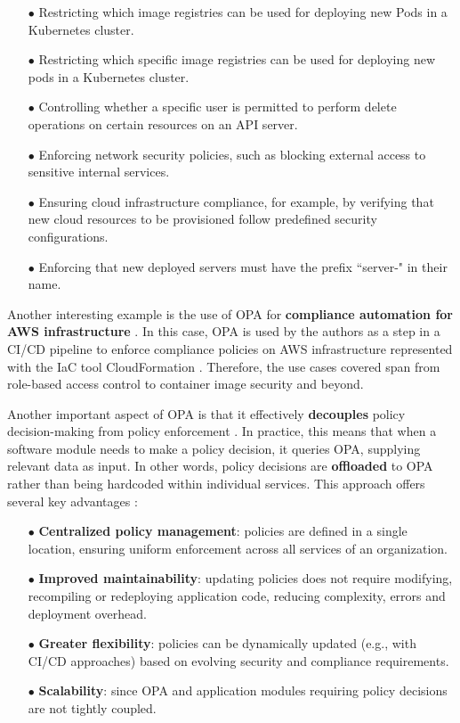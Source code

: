 \begin{itemize}[itemsep=0.2pt, topsep=1pt] \item[$\bullet$] Restricting which image registries can be used for deploying new Pods in a Kubernetes cluster.
    \item[$\bullet$] Restricting which specific image registries can be used for deploying new pods in a Kubernetes cluster.
    \item[$\bullet$] Controlling whether a specific user is permitted to perform delete operations on certain resources on an API server.
    \item[$\bullet$] Enforcing network security policies, such as blocking external access to sensitive internal services.
    \item[$\bullet$] Ensuring cloud infrastructure compliance, for example, by verifying that new cloud resources to be provisioned follow predefined security configurations.
    \item[$\bullet$] Enforcing that new deployed servers must have the prefix ``server-" in their name.
\end{itemize}

Another interesting example is the use of OPA for \textbf{compliance automation for AWS infrastructure} \cite{10612535}. 
In this case, OPA is used by the authors as a step in a CI/CD pipeline to enforce compliance policies on AWS infrastructure represented with the IaC tool CloudFormation \cite{10612535}.
Therefore, the use cases covered span from role-based access control to container image security and beyond.
\newline

Another important aspect of OPA is that it effectively \textbf{decouples} policy decision-making from policy enforcement \cite{opa_docs}.
In practice, this means that when a software module needs to make a policy decision, it queries OPA, supplying relevant data as input. 
In other words, policy decisions are \textbf{offloaded} to OPA rather than being hardcoded within individual services. 
This approach offers several key advantages \cite{opa_docs}:
\begin{itemize}[itemsep=0.2pt, topsep=1pt]
  \item[$\bullet$] \textbf{Centralized policy management}: policies are defined in a single location, ensuring uniform enforcement across all services of an organization.
  \item[$\bullet$] \textbf{Improved maintainability}: updating policies does not require modifying, recompiling or redeploying application code, reducing complexity, errors and deployment overhead.
  \item[$\bullet$] \textbf{Greater flexibility}: policies can be dynamically updated (e.g., with CI/CD approaches) based on evolving security and compliance requirements. 
  \item[$\bullet$] \textbf{Scalability}: since OPA and application modules requiring policy decisions are not tightly coupled.
\end{itemize} 

